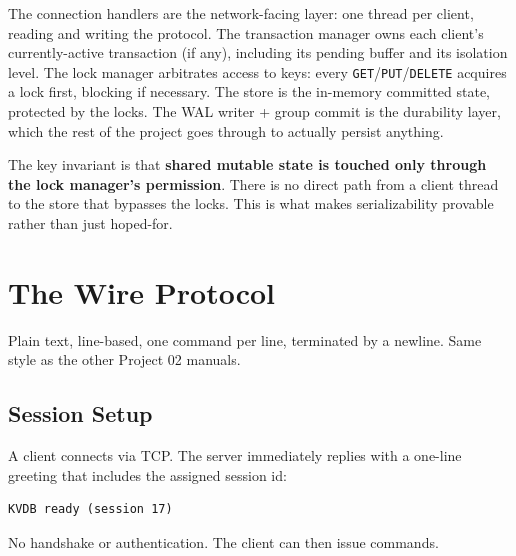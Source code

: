 \documentclass[11pt,a4paper]{article}
\begin{document}
The connection handlers are the network-facing layer: one thread per client, reading and writing the protocol. The transaction manager owns each client's currently-active transaction (if any), including its pending buffer and its isolation level. The lock manager arbitrates access to keys: every \texttt{GET}/\texttt{PUT}/\texttt{DELETE} acquires a lock first, blocking if necessary. The store is the in-memory committed state, protected by the locks. The WAL writer + group commit is the durability layer, which the rest of the project goes through to actually persist anything.

The key invariant is that \textbf{shared mutable state is touched only through the lock manager's permission}. There is no direct path from a client thread to the store that bypasses the locks. This is what makes serializability provable rather than just hoped-for.

\section{The Wire Protocol}

Plain text, line-based, one command per line, terminated by a newline. Same style as the other Project 02 manuals.

\subsection{Session Setup}
A client connects via TCP. The server immediately replies with a one-line greeting that includes the assigned session id:

\begin{codebox}
\begin{lstlisting}
KVDB ready (session 17)
\end{lstlisting}
\end{codebox}

No handshake or authentication. The client can then issue commands.
\end{document}
